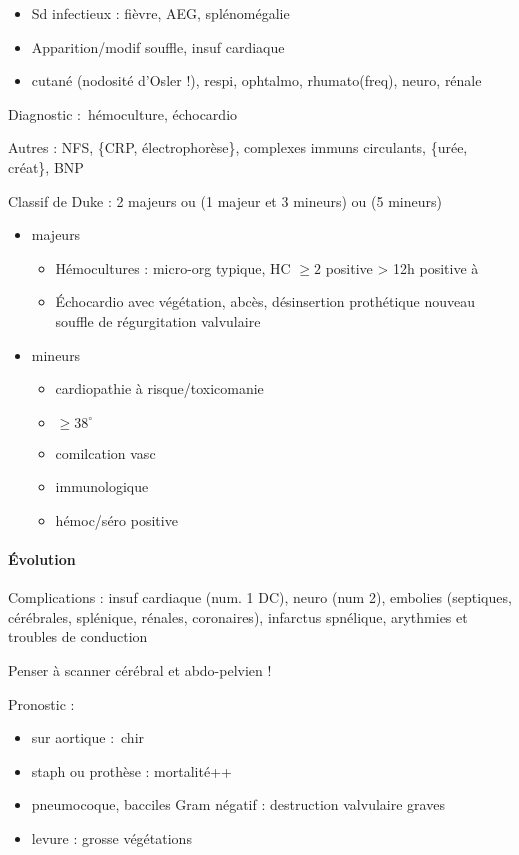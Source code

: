 \begin{itemize}
  \item Sd infectieux : fièvre, AEG, splénomégalie
  \item Apparition/modif souffle, insuf cardiaque
  \item cutané (nodosité d'Osler !), respi, ophtalmo, rhumato(freq), neuro,
    rénale
\end{itemize}

Diagnostic : hémoculture, échocardio

Autres : NFS, \{CRP, électrophorèse\}, complexes immuns circulants, \{urée,
créat\}, BNP

Classif de Duke : 2 majeurs ou (1 majeur et 3 mineurs) ou (5 mineurs)
\begin{itemize}
  \item majeurs
    \begin{itemize}
      \item Hémocultures : micro-org typique, HC $\ge 2$ \lor{} positive > 12h
        \lor{} positive à 
      \item Échocardio avec végétation, abcès, désinsertion prothétique \lor{} nouveau souffle de régurgitation valvulaire
    \end{itemize}
  \item mineurs
    \begin{itemize}
      \item cardiopathie à risque/toxicomanie
      \item $\ge 38^{\circ}$
      \item comilcation vasc
      \item immunologique
      \item hémoc/séro positive
    \end{itemize}
\end{itemize}

\paragraph{Évolution}
Complications : insuf cardiaque (num. 1 DC), neuro (num 2), embolies (septiques,
cérébrales, splénique, rénales, coronaires), infarctus spnélique, arythmies et
troubles de conduction

Penser à scanner cérébral et abdo-pelvien !

Pronostic : 
\begin{itemize}
  \item sur aortique : chir
  \item staph ou prothèse : mortalité++
  \item pneumocoque, bacciles Gram négatif : destruction valvulaire graves
  \item levure : grosse végétations
\end{itemize}

